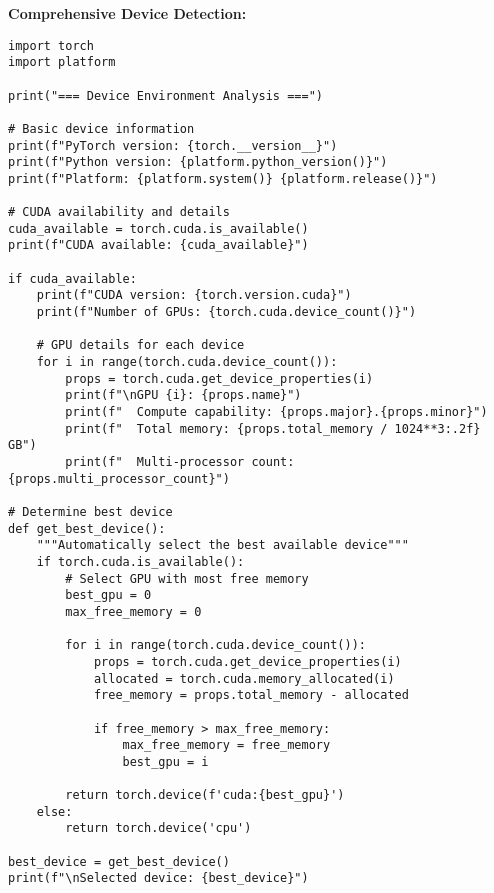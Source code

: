 \documentclass[11pt,a4paper]{book}
\begin{document}
\textbf{Comprehensive Device Detection:}
\begin{verbatim}
import torch
import platform

print("=== Device Environment Analysis ===")

# Basic device information
print(f"PyTorch version: {torch.__version__}")
print(f"Python version: {platform.python_version()}")
print(f"Platform: {platform.system()} {platform.release()}")

# CUDA availability and details
cuda_available = torch.cuda.is_available()
print(f"CUDA available: {cuda_available}")

if cuda_available:
    print(f"CUDA version: {torch.version.cuda}")
    print(f"Number of GPUs: {torch.cuda.device_count()}")
    
    # GPU details for each device
    for i in range(torch.cuda.device_count()):
        props = torch.cuda.get_device_properties(i)
        print(f"\nGPU {i}: {props.name}")
        print(f"  Compute capability: {props.major}.{props.minor}")
        print(f"  Total memory: {props.total_memory / 1024**3:.2f} GB")
        print(f"  Multi-processor count: {props.multi_processor_count}")

# Determine best device
def get_best_device():
    """Automatically select the best available device"""
    if torch.cuda.is_available():
        # Select GPU with most free memory
        best_gpu = 0
        max_free_memory = 0
        
        for i in range(torch.cuda.device_count()):
            props = torch.cuda.get_device_properties(i)
            allocated = torch.cuda.memory_allocated(i)
            free_memory = props.total_memory - allocated
            
            if free_memory > max_free_memory:
                max_free_memory = free_memory
                best_gpu = i
        
        return torch.device(f'cuda:{best_gpu}')
    else:
        return torch.device('cpu')

best_device = get_best_device()
print(f"\nSelected device: {best_device}")
\end{verbatim}
\end{document}
